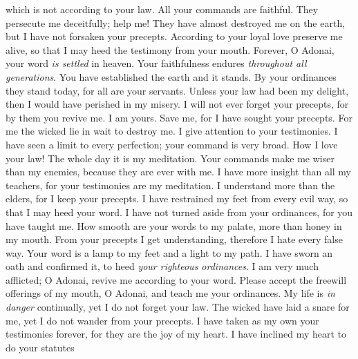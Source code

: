 \begin{biblechapter}
which is not according to your law.
\verse All your commands are faithful. 
They persecute me deceitfully; help me!
\verse They have almost destroyed me on the earth, 
but I have not forsaken your precepts.
\verse According to your loyal love preserve me alive, 
so that I may heed the testimony from your mouth.
 Forever, O Adonai, 
your word \textit{is settled} in heaven.
\verse Your faithfulness endures \textit{throughout all generations}. 
You have established the earth and it stands.
\verse By your ordinances they stand today, 
for all are your servants.
\verse Unless your law had been my delight, 
then I would have perished in my misery.
\verse I will not ever forget your precepts, 
for by them you revive me.
\verse I am yours. Save me, 
for I have sought your precepts.
\verse For me the wicked lie in wait to destroy me. 
I give attention to your testimonies.
\verse I have seen a limit to every perfection; 
your command is very broad.
 How I love your law! 
The whole day it is my meditation.
\verse Your commands make me wiser than my enemies, 
because they are ever with me.
\verse I have more insight than all my teachers, 
for your testimonies are my meditation.
\verse I understand more than the elders, 
for I keep your precepts.
\verse I have restrained my feet from every evil way, 
so that I may heed your word.
\verse I have not turned aside from your ordinances, 
for you have taught me.
\verse How smooth are your words to my palate, 
more than honey in my mouth.
\verse From your precepts I get understanding, 
therefore I hate every false way.
 Your word is a lamp to my feet 
and a light to my path.
\verse I have sworn an oath and confirmed it, 
to heed \textit{your righteous ordinances}.
\verse I am very much afflicted; 
O Adonai, revive me according to your word.
\verse Please accept the freewill offerings of my mouth, O Adonai, 
and teach me your ordinances.
\verse My life is \textit{in danger} continually, 
yet I do not forget your law.
\verse The wicked have laid a snare for me, 
yet I do not wander from your precepts.
\verse I have taken as my own your testimonies forever, 
for they are the joy of my heart.
\verse I have inclined my heart to do your statutes 

\end{biblechapter}
